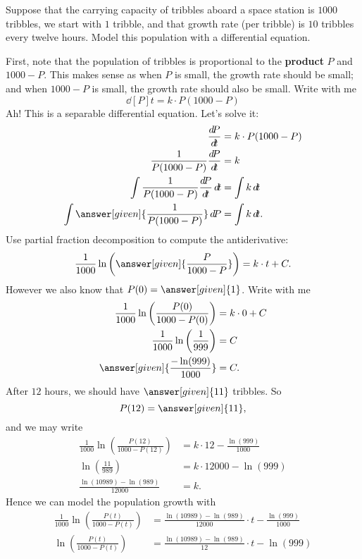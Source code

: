 \documentclass{ximera}
\begin{document}
\begin{example}
Suppose that the carrying capacity of tribbles aboard a space station
is $1000$ tribbles, we start with $1$ tribble, and that growth rate
(per tribble) is $10$ tribbles every twelve hours. Model this
population with a differential equation.
\begin{explanation}
  First, note that the population of tribbles is proportional to the
  \textbf{product} $P$ and $1000-P$. This makes sense as when $P$ is
  small, the growth rate should be small; and when $1000-P$ is small,
  the growth rate should also be small. Write with me
  \[
  \dd[P]{t}  = k \cdot P (1000-P)
  \]
  Ah! This is a separable differential equation. Let's solve it:
  \begin{align*}
    \dd[P]{t}  &= k \cdot P (1000-P)\\
    \frac{1}{P (1000-P)}\dd[P]{t}  &= k \\
    \int \frac{1}{P (1000-P)}\dd[P]{t}\d t  &= \int k\d t \\
    \int \answer[given]{\frac{1}{P (1000-P)}} \d P  &= \int k\d t.
  \end{align*}
  Use partial fraction decomposition to compute the antiderivative:
  \[
    \frac{1}{1000}\ln\left(\answer[given]{\frac{P}{1000-P}}\right)   = k\cdot t + C.
  \]
  However we also know that $P(0) = \answer[given]{1}$. Write with me
  \begin{align*}
      \frac{1}{1000}\ln\left(\frac{P(0)}{1000-P(0)}\right)  &= k\cdot 0 + C\\
      \frac{1}{1000}\ln\left(\frac{1}{999}\right)  &= C\\
      \answer[given]{\frac{-\ln(999)}{1000}}  &= C.
  \end{align*}
  After $12$ hours, we should have $\answer[given]{11}$ tribbles. So 
  \[
  P(12) = \answer[given]{11},
  \]
  and we may write
  \begin{align*}
    \frac{1}{1000}\ln\left(\frac{P(12)}{1000-P(12)}\right) &= k\cdot 12-\frac{\ln(999)}{1000}\\
    \ln\left(\frac{11}{989}\right) &= k\cdot 12000-\ln(999) \\
    \frac{\ln(10989)-\ln(989)}{12000} &= k.
  \end{align*}
  Hence we can model the population growth with
  \begin{align*}
    \frac{1}{1000}\ln\left(\frac{P(t)}{1000-P(t)}\right)  &= \frac{\ln(10989)-\ln(989)}{12000}\cdot t - \frac{\ln(999)}{1000}\\
    \ln\left(\frac{P(t)}{1000-P(t)}\right)  &= \frac{\ln(10989)-\ln(989)}{12}\cdot t - \ln(999)\\

\end{align*}
\end{explanation}
\end{example}
\end{document}
